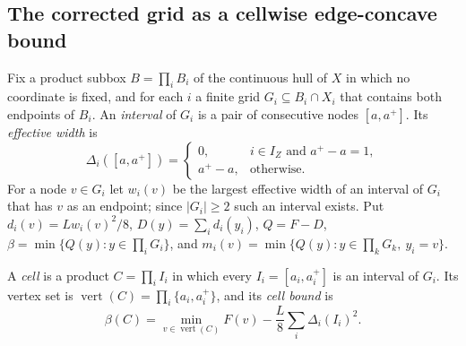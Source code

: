 
\subsection{The corrected grid as a cellwise edge-concave bound}\label{sec:lc-cellwise}

Fix a product subbox $B=\prod_i B_i$ of the continuous hull of $X$ in which
no coordinate is fixed, and for each $i$ a finite grid
$G_i\subseteq B_i\cap X_i$ that contains both endpoints of $B_i$. An
\emph{interval} of $G_i$ is a pair of consecutive nodes $[a,a^+]$. Its
\emph{effective width} is
\[
\Delta_i([a,a^+])=
\begin{cases}
0, & i\in I_Z \text{ and } a^+-a=1,\\
a^+-a, & \text{otherwise.}
\end{cases}
\]
For a node $v\in G_i$ let $w_i(v)$ be the largest effective width of an
interval of $G_i$ that has $v$ as an endpoint; since $|G_i|\ge2$ such an
interval exists. Put $d_i(v)=Lw_i(v)^2/8$, $D(y)=\sum_id_i(y_i)$,
$Q=F-D$, $\beta=\min\{Q(y):y\in\prod_iG_i\}$, and
$m_i(v)=\min\{Q(y):y\in\prod_kG_k,\ y_i=v\}$.

\begin{definition}
A \emph{cell} is a product $C=\prod_iI_i$ in which every $I_i=[a_i,a_i^+]$
is an interval of $G_i$. Its vertex set is
$\operatorname{vert}(C)=\prod_i\{a_i,a_i^+\}$, and its \emph{cell bound} is
\[
\beta(C)=\min_{v\in\operatorname{vert}(C)}F(v)
-\frac L8\sum_{i}\Delta_i(I_i)^2 .
\]
\end{definition}

